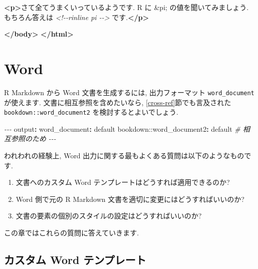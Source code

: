 \documentclass[
  11pt,
  lualatex,ja=standard,jafont=noto]{bxjsreport}
\newenvironment{Shaded}{\begin{snugshade}}{\end{snugshade}}
\newcommand{\AttributeTok}[1]{\textcolor[rgb]{0.77,0.63,0.00}{#1}}
\newcommand{\CommentTok}[1]{\textcolor[rgb]{0.56,0.35,0.01}{\textit{#1}}}
\newcommand{\DecValTok}[1]{\textcolor[rgb]{0.00,0.00,0.81}{#1}}
\newcommand{\FunctionTok}[1]{\textcolor[rgb]{0.00,0.00,0.00}{#1}}
\newcommand{\KeywordTok}[1]{\textcolor[rgb]{0.13,0.29,0.53}{\textbf{#1}}}
\newcommand{\NormalTok}[1]{#1}
\newcommand{\PreprocessorTok}[1]{\textcolor[rgb]{0.56,0.35,0.01}{\textit{#1}}}
\begin{document}
\begin{Shaded}
\begin{Highlighting}[]
  \KeywordTok{\textless{}p\textgreater{}}\NormalTok{さて全てうまくいっているようです. R に }\DecValTok{\&pi;}\NormalTok{ の値を聞いてみましょう. もちろん答えは }\CommentTok{\textless{}!{-}{-}rinline pi {-}{-}\textgreater{}}\NormalTok{ です.}\KeywordTok{\textless{}/p\textgreater{}}

\KeywordTok{\textless{}/body\textgreater{}}
\KeywordTok{\textless{}/html\textgreater{}}
\end{Highlighting}
\end{Shaded}

\hypertarget{word}{%
\chapter{Word}\label{word}}

R Markdown から Word 文書を生成するには, 出力フォーマット \texttt{word\_document} が使えます. 文書に相互参照を含めたいなら, \ref{cross-ref}節でも言及された \texttt{bookdown::word\_document2} を検討するとよいでしょう.

\begin{Shaded}
\begin{Highlighting}[]
\PreprocessorTok{{-}{-}{-}}
\FunctionTok{output}\KeywordTok{:}
\AttributeTok{  }\FunctionTok{word\_document}\KeywordTok{:}\AttributeTok{ default}
\AttributeTok{  bookdown::word\_document2}\KeywordTok{:}\FunctionTok{}\AttributeTok{ default}\CommentTok{  \# 相互参照のため}
\PreprocessorTok{{-}{-}{-}}
\end{Highlighting}
\end{Shaded}

われわれの経験上, Word 出力に関する最もよくある質問は以下のようなものです.

\begin{enumerate}
\def\labelenumi{\arabic{enumi}.}
\item
  文書へのカスタム Word テンプレートはどうすれば適用できるのか?
\item
  Word 側で元の R Markdown 文書を適切に変更にはどうすればいいのか?
\item
  文書の要素の個別のスタイルの設定はどうすればいいのか?
\end{enumerate}

この章ではこれらの質問に答えていきます.

\hypertarget{word-template}{%
\section{カスタム Word テンプレート}\label{word-template}}
\end{document}
